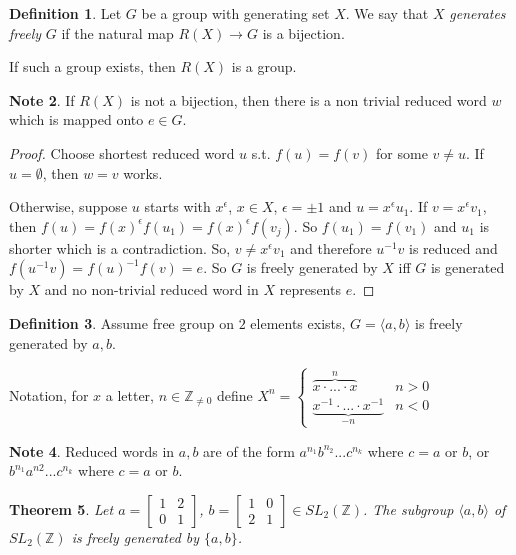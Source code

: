 \documentclass{amsart}
\newtheorem{thm}{Theorem}[section]
\theoremstyle{definition}
\newtheorem{definition}[thm]{Definition}
\newtheorem{note}[thm]{Note}
\newcommand{\Z}{\mathbb Z}
\begin{document}
\begin{definition}
	Let $G$ be a group with generating set $X$. We say that $X$ \emph{generates freely} $G$ if the natural map $R(X)\to G$ is a bijection.
	
	If such a group exists, then $R(X)$ is a group.
\end{definition}
\begin{note}
	If $R(X)$ is not a bijection, then there is a non trivial reduced word $w$ which is mapped onto $e\in G$.	
\end{note}
\begin{proof}
	Choose shortest reduced word $u$ s.t. $f(u)=f(v)$ for some $v\not=u$. If $u=\emptyset$, then $w=v$ works.
	
	Otherwise, suppose $u$ starts with $x^\epsilon$, $x\in X$, $\epsilon=\pm 1$ and $u=x^\epsilon u_1$. If $v=x^\epsilon v_1$, then $f(u)=f(x)^\epsilon f(u_1)=f(x)^\epsilon f(v_j)$. So $f(u_1)=f(v_1)$ and $u_1$ is shorter which is a contradiction. So, $v\not=x^{\epsilon}v_1$ and therefore $u^{-1}v$ is reduced and $f(u^{-1}v)=f(u)^{-1}f(v)=e$. So $G$ is freely generated by $X$ iff $G$ is generated by $X$ and no non-trivial reduced word in $X$ represents $e$.
 \end{proof}
\begin{definition}
	Assume free group on $2$ elements exists, $G=\langle a,b\rangle$ is freely generated by $a,b$.
	
	Notation, for $x$ a letter, $n\in\Z_{\not=0}$ define $X^n=\begin{cases}
		\overbrace{x\cdot ...\cdot x}^n&n>0\\
		\underbrace{x^{-1}\cdot ...\cdot x^{-1}}_{-n}&n<0
	\end{cases}$
\end{definition}
\begin{note}
	Reduced	words in $a,b$ are of the form $a^{n_1}b^{n_2}...c^{n_k}$ where $c=a$ or $b$, or $b^{n_1}a^{n2}...c^{n_k}$ where $c=a$ or $b$.
\end{note}
\begin{thm}
	Let $a=\begin{bmatrix}
		1&2\\0&1
	\end{bmatrix}$, $b=\begin{bmatrix}
1&0\\2&1	
\end{bmatrix}\in SL_2(\Z)
$. The subgroup $\langle a,b\rangle$ of $SL_2(\Z)$ is freely generated by $\{a,b\}$.
\end{thm}
\end{document}
